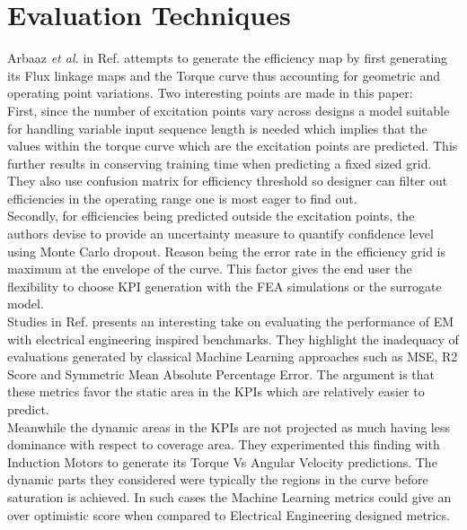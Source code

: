 \documentclass{report} %
\begin{document}
\section{Evaluation Techniques}\label{sec:LR Evaluation Techniques}
Arbaaz \textit{et al.} in Ref. \cite{DL-ETA-2019} attempts to generate the efficiency map by first generating its Flux linkage maps and the Torque curve 
thus accounting for geometric and operating point variations. Two interesting points are made in this paper:\\
First, since the number of excitation points vary across designs a model suitable for handling variable input sequence length is needed which implies that the values 
within the torque curve which are the excitation points are predicted. This further results in conserving training time when predicting a fixed sized grid.
They also use confusion matrix for efficiency threshold so designer can filter out efficiencies in the operating range one is most eager to find out.\\
Secondly, for efficiencies being predicted outside the excitation points, the authors devise to provide an uncertainty measure to quantify confidence level using 
Monte Carlo dropout. Reason being the error rate in the efficiency grid is maximum at the envelope of the curve. This factor gives the end user 
the flexibility to choose \ac{KPI} generation with the \ac{FEA} simulations or the surrogate model.\\

Studies in Ref. \cite{EM-PM-2020} presents an interesting take on evaluating the performance of \ac{EM} with electrical engineering inspired benchmarks.
They highlight the inadequacy of evaluations generated by classical Machine Learning approaches such as \ac{MSE}, R2 Score and Symmetric Mean Absolute Percentage Error.
The argument is that these metrics favor the static area in the \ac{KPI}s which are relatively easier to predict.\\
Meanwhile the dynamic areas in the \ac{KPI}s are not projected as much having less dominance with respect to coverage area. They experimented this finding with 
Induction Motors to generate its Torque Vs Angular Velocity predictions. The dynamic parts they considered were typically the regions in the curve before saturation is achieved. 
In such cases the Machine Learning metrics could give an over optimistic score when compared to Electrical Engineering designed metrics.\\
\end{document}
